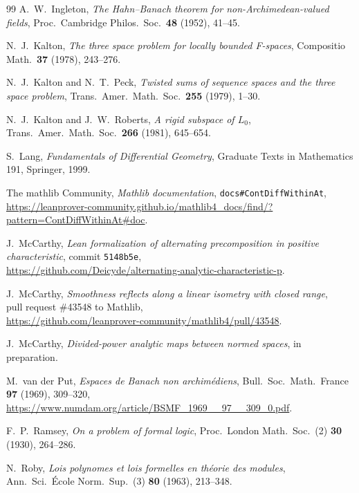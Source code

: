 \begin{thebibliography}{99}
 A.~W.~Ingleton, \emph{The Hahn--Banach theorem for non-Archimedean-valued fields}, Proc.\ Cambridge Philos.\
Soc.\ \textbf{48} (1952), 41--45.

 N.~J.~Kalton, \emph{The three space problem for locally bounded F-spaces}, Compositio Math.\ \textbf{37}
(1978), 243--276.

 N.~J.~Kalton and N.~T.~Peck, \emph{Twisted sums of sequence spaces and the three space problem}, Trans.\
Amer.\ Math.\ Soc.\ \textbf{255} (1979), 1--30.

 N.~J.~Kalton and J.~W.~Roberts, \emph{A rigid subspace of $L_0$}, Trans.\ Amer.\ Math.\ Soc.\ \textbf{266}
(1981), 645--654.

 S.~Lang, \emph{Fundamentals of Differential Geometry}, Graduate Texts in Mathematics 191, Springer, 1999.

\bibitem{docs} The mathlib Community, \emph{Mathlib documentation}, \texttt{docs\#ContDiffWithinAt},\\
{\footnotesize\url{https://leanprover-community.github.io/mathlib4_docs/find/?pattern=ContDiffWithinAt#doc}}.

\bibitem{LeanP} J.~McCarthy, \emph{Lean formalization of alternating precomposition in positive characteristic},
commit \texttt{5148b5e},\\
{\small\url{https://github.com/Deicyde/alternating-analytic-characteristic-p}}.

\bibitem{PR} J.~McCarthy, \emph{Smoothness reflects along a linear isometry with closed range},\\ pull request \#43548
to Mathlib,\\ {\small\url{https://github.com/leanprover-community/mathlib4/pull/43548}}.

\bibitem[II]{II} J.~McCarthy, \emph{Divided-power analytic maps between normed spaces}, in preparation.

\bibitem{VdP} M.~van der Put, \emph{Espaces de Banach non archim\'ediens}, Bull.\ Soc.\ Math.\ France
\textbf{97} (1969), 309--320,\\
{\small\url{https://www.numdam.org/article/BSMF_1969__97__309_0.pdf}}.

\bibitem{Ra} F.~P.~Ramsey, \emph{On a problem of formal logic}, Proc.\ London Math.\ Soc.\ (2) \textbf{30} (1930), 264--286.

\bibitem{Ro} N.~Roby, \emph{Lois polynomes et lois formelles en th\'eorie des modules}, Ann.\ Sci.\ \'Ecole Norm.\
Sup.\ (3) \textbf{80} (1963), 213--348.


\end{thebibliography}
